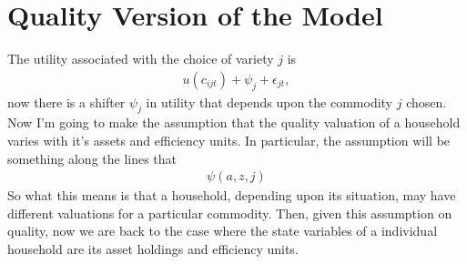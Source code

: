 \documentclass[12pt,pdftex]{article}
\begin{document}
\begin{onehalfspacing}
\begin{itemize}
%
\end{itemize}

\newpage

\section{Quality Version of the Model}

The utility associated with the choice of variety $j$ is
\begin{align}
u(c_{ijt}) + \psi_{j} + \epsilon_{jt}, \label{apx-eq:utility-quality}
\end{align}
now there is a shifter $\psi_{j}$ in utility that depends upon the commodity $j$ chosen. Now I'm going to make the assumption that the quality valuation of a household varies with it's assets and efficiency units. In particular, the assumption will be something along the lines that
\begin{align}
\psi(a, z, j)
\end{align}
So what this means is that a household, depending upon its situation, may have different valuations for a particular commodity. Then, given this assumption on quality, now we are back to the case where the state variables of a individual household are its asset holdings and efficiency units.


\end{onehalfspacing}
\end{document}
